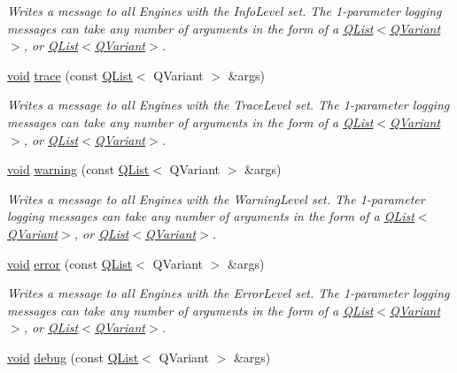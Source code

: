 \begin{DoxyCompactItemize}
\begin{DoxyCompactList}\small\item\em Writes a message to all Engines with the Info\-Level set. The 1-\/parameter logging messages can take any number of arguments in the form of a \hyperlink{class_q_list}{Q\-List$<$\-Q\-Variant$>$}, or \hyperlink{class_q_list}{Q\-List$<$\-Q\-Variant$>$}. \end{DoxyCompactList}\item 
\hyperlink{group___u_a_v_objects_plugin_ga444cf2ff3f0ecbe028adce838d373f5c}{void} \hyperlink{class_qxt_logger_a0e3cb81604678ba9a53dafaca9a9929d}{trace} (const \hyperlink{class_q_list}{Q\-List}$<$ Q\-Variant $>$ \&args)
\begin{DoxyCompactList}\small\item\em Writes a message to all Engines with the Trace\-Level set. The 1-\/parameter logging messages can take any number of arguments in the form of a \hyperlink{class_q_list}{Q\-List$<$\-Q\-Variant$>$}, or \hyperlink{class_q_list}{Q\-List$<$\-Q\-Variant$>$}. \end{DoxyCompactList}\item 
\hyperlink{group___u_a_v_objects_plugin_ga444cf2ff3f0ecbe028adce838d373f5c}{void} \hyperlink{class_qxt_logger_a4a37de2b0b7d4fd19ac081159e240f17}{warning} (const \hyperlink{class_q_list}{Q\-List}$<$ Q\-Variant $>$ \&args)
\begin{DoxyCompactList}\small\item\em Writes a message to all Engines with the Warning\-Level set. The 1-\/parameter logging messages can take any number of arguments in the form of a \hyperlink{class_q_list}{Q\-List$<$\-Q\-Variant$>$}, or \hyperlink{class_q_list}{Q\-List$<$\-Q\-Variant$>$}. \end{DoxyCompactList}\item 
\hyperlink{group___u_a_v_objects_plugin_ga444cf2ff3f0ecbe028adce838d373f5c}{void} \hyperlink{class_qxt_logger_a1d9193b18cdc2a44f944f3c075644753}{error} (const \hyperlink{class_q_list}{Q\-List}$<$ Q\-Variant $>$ \&args)
\begin{DoxyCompactList}\small\item\em Writes a message to all Engines with the Error\-Level set. The 1-\/parameter logging messages can take any number of arguments in the form of a \hyperlink{class_q_list}{Q\-List$<$\-Q\-Variant$>$}, or \hyperlink{class_q_list}{Q\-List$<$\-Q\-Variant$>$}. \end{DoxyCompactList}\item 
\hyperlink{group___u_a_v_objects_plugin_ga444cf2ff3f0ecbe028adce838d373f5c}{void} \hyperlink{class_qxt_logger_adabd79c853615379f97333f38d961245}{debug} (const \hyperlink{class_q_list}{Q\-List}$<$ Q\-Variant $>$ \&args)

\end{DoxyCompactItemize}
